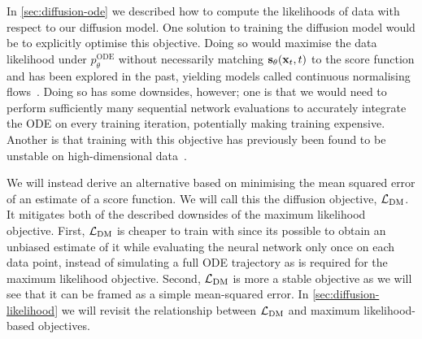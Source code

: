 In \cref{sec:diffusion-ode} we described how to compute the likelihoods of data with respect to our diffusion model. One solution to training the diffusion model would be to explicitly optimise this objective. Doing so would maximise the data likelihood under $p_\theta^\text{ODE}$ without necessarily matching ${\mathbf{s}}_\theta({\mathbf{x}}_t, t)$ to the score function and has been explored in the past, yielding models called continuous normalising flows~\cite{chen2018neural}. Doing so has some downsides, however; one is that we would need to perform sufficiently many sequential network evaluations to accurately integrate the ODE on every training iteration, potentially making training expensive. Another is that training with this objective has previously been found to be unstable on high-dimensional data~\citep{weilbach2020structured}. 

We will instead derive an alternative based on minimising the mean squared error of an estimate of a score function. 
We will call this the diffusion objective, ${\mathcal{L}}_\text{DM}$. It mitigates both of the described downsides of the maximum likelihood objective. First, ${\mathcal{L}}_\text{DM}$ is cheaper to train with since its possible to obtain an unbiased estimate of it while evaluating the neural network only once on each data point, instead of simulating a full ODE trajectory as is required for the maximum likelihood objective. Second, ${\mathcal{L}}_\text{DM}$ is more a stable objective as we will see that it can be framed as a simple mean-squared error. In \cref{sec:diffusion-likelihood} we will revisit the relationship between ${\mathcal{L}}_\text{DM}$ and maximum likelihood-based objectives.


